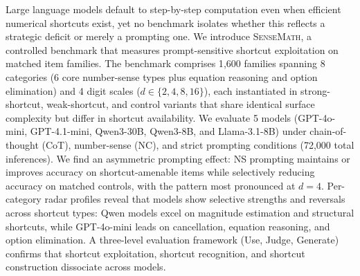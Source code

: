 Large language models default to step-by-step computation even when efficient numerical shortcuts exist, yet no benchmark isolates whether this reflects a strategic deficit or merely a prompting one.
We introduce \textsc{SenseMath}, a controlled benchmark that measures prompt-sensitive shortcut exploitation on matched item families.
The benchmark comprises 1{,}600 families spanning 8 categories (6 core number-sense types plus equation reasoning and option elimination) and 4 digit scales ($d \in \{2, 4, 8, 16\}$), each instantiated in strong-shortcut, weak-shortcut, and control variants that share identical surface complexity but differ in shortcut availability.
We evaluate 5 models (GPT-4o-mini, GPT-4.1-mini, Qwen3-30B, Qwen3-8B, and Llama-3.1-8B) under chain-of-thought (CoT), number-sense (NC), and strict prompting conditions (72{,}000 total inferences).
We find an asymmetric prompting effect: NS prompting maintains or improves accuracy on shortcut-amenable items while selectively reducing accuracy on matched controls, with the pattern most pronounced at $d{=}4$.
Per-category radar profiles reveal that models show selective strengths and reversals across shortcut types: Qwen models excel on magnitude estimation and structural shortcuts, while GPT-4o-mini leads on cancellation, equation reasoning, and option elimination.
A three-level evaluation framework (Use, Judge, Generate) confirms that shortcut exploitation, shortcut recognition, and shortcut construction dissociate across models.
